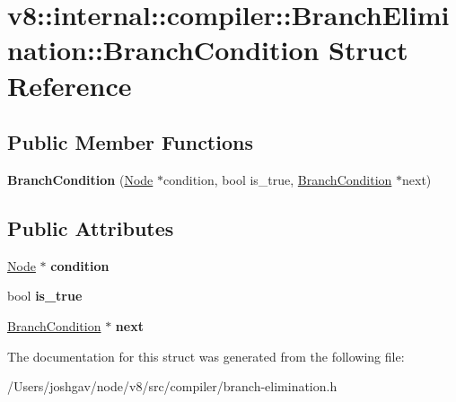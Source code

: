 \hypertarget{structv8_1_1internal_1_1compiler_1_1_branch_elimination_1_1_branch_condition}{}\section{v8\+:\+:internal\+:\+:compiler\+:\+:Branch\+Elimination\+:\+:Branch\+Condition Struct Reference}
\label{structv8_1_1internal_1_1compiler_1_1_branch_elimination_1_1_branch_condition}
\subsection*{Public Member Functions}
\begin{DoxyCompactItemize}
\item 
{\bfseries Branch\+Condition} (\hyperlink{classv8_1_1internal_1_1compiler_1_1_node}{Node} $\ast$condition, bool is\+\_\+true, \hyperlink{structv8_1_1internal_1_1compiler_1_1_branch_elimination_1_1_branch_condition}{Branch\+Condition} $\ast$next)\hypertarget{structv8_1_1internal_1_1compiler_1_1_branch_elimination_1_1_branch_condition_ab1bfbedd84885b01d5054c474abd4e83}{}\label{structv8_1_1internal_1_1compiler_1_1_branch_elimination_1_1_branch_condition_ab1bfbedd84885b01d5054c474abd4e83}

\end{DoxyCompactItemize}
\subsection*{Public Attributes}
\begin{DoxyCompactItemize}
\item 
\hyperlink{classv8_1_1internal_1_1compiler_1_1_node}{Node} $\ast$ {\bfseries condition}\hypertarget{structv8_1_1internal_1_1compiler_1_1_branch_elimination_1_1_branch_condition_a7a18f457804f73e274de469e606c1df7}{}\label{structv8_1_1internal_1_1compiler_1_1_branch_elimination_1_1_branch_condition_a7a18f457804f73e274de469e606c1df7}

\item 
bool {\bfseries is\+\_\+true}\hypertarget{structv8_1_1internal_1_1compiler_1_1_branch_elimination_1_1_branch_condition_a5ac84d10666bb8c7ef178ebd21f348ce}{}\label{structv8_1_1internal_1_1compiler_1_1_branch_elimination_1_1_branch_condition_a5ac84d10666bb8c7ef178ebd21f348ce}

\item 
\hyperlink{structv8_1_1internal_1_1compiler_1_1_branch_elimination_1_1_branch_condition}{Branch\+Condition} $\ast$ {\bfseries next}\hypertarget{structv8_1_1internal_1_1compiler_1_1_branch_elimination_1_1_branch_condition_a1d45243dc57c00543f72c397f21ff962}{}\label{structv8_1_1internal_1_1compiler_1_1_branch_elimination_1_1_branch_condition_a1d45243dc57c00543f72c397f21ff962}

\end{DoxyCompactItemize}


The documentation for this struct was generated from the following file\+:\begin{DoxyCompactItemize}
\item 
/\+Users/joshgav/node/v8/src/compiler/branch-\/elimination.\+h\end{DoxyCompactItemize}
